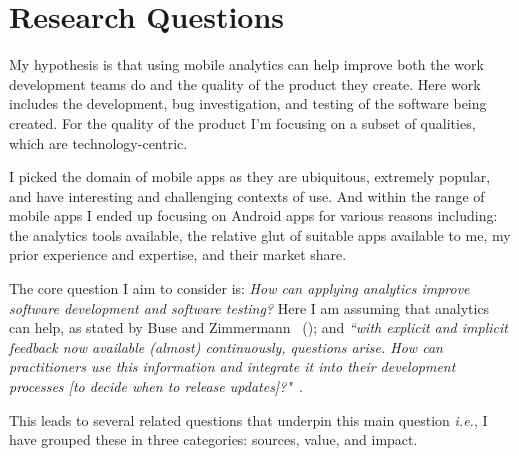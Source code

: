 \section{Research Questions}
\label{section-research-questions}

My hypothesis is that using mobile analytics can help improve both the work development teams do and the quality of the product they create. Here work includes the development, bug investigation, and testing of the software being created. For the quality of the product I'm focusing on a subset of qualities, which are technology-centric.

I picked the domain of mobile apps as they are ubiquitous, extremely popular, and have interesting and challenging contexts of use. And within the range of mobile apps I ended up focusing on Android apps for various reasons including: the analytics tools available, the relative glut of suitable apps available to me, my prior experience and expertise, and their market share.

The core question I aim to consider is: 
\emph{How can applying analytics improve software development and software testing?} Here I am assuming that analytics can help, as stated by Buse and Zimmermann ~(\citeyear{buse_analytics_2010}); and \emph{``with explicit and implicit feedback now available (almost) continuously, questions arise. How can practitioners use this information and integrate it into their development processes [to decide when to release updates]?"}~\citep{maalej2016_towards_data_driven_requirements_engineering}.

This leads to several related questions that underpin this main question \emph{i.e.}, I have grouped these in three categories: sources, value, and impact.





